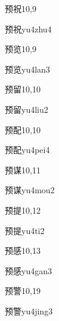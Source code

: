 \begin{entry}{预祝}{10,9}
  \begin{phonetics}{预祝}{yu4zhu4}
  \end{phonetics}
\end{entry}

\begin{entry}{预览}{10,9}
  \begin{phonetics}{预览}{yu4lan3}
  \end{phonetics}
\end{entry}

\begin{entry}{预留}{10,10}
  \begin{phonetics}{预留}{yu4liu2}
  \end{phonetics}
\end{entry}

\begin{entry}{预配}{10,10}
  \begin{phonetics}{预配}{yu4pei4}
  \end{phonetics}
\end{entry}

\begin{entry}{预谋}{10,11}
  \begin{phonetics}{预谋}{yu4mou2}
  \end{phonetics}
\end{entry}

\begin{entry}{预提}{10,12}
  \begin{phonetics}{预提}{yu4ti2}
  \end{phonetics}
\end{entry}

\begin{entry}{预感}{10,13}
  \begin{phonetics}{预感}{yu4gan3}
  \end{phonetics}
\end{entry}

\begin{entry}{预警}{10,19}
  \begin{phonetics}{预警}{yu4jing3}
  \end{phonetics}
\end{entry}

